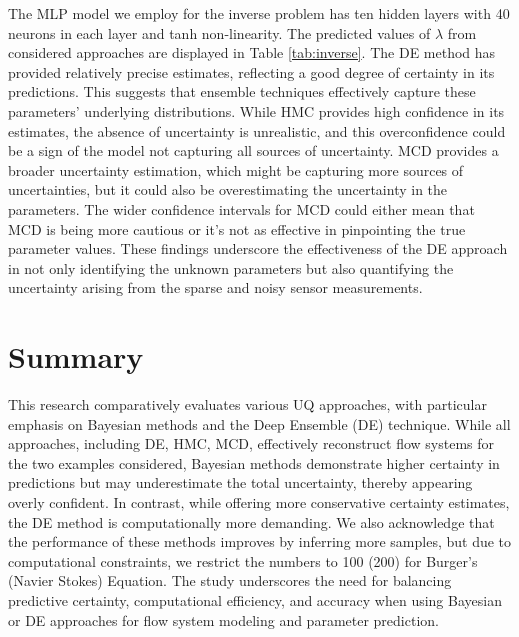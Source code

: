 \documentclass{article}
\begin{document}
The MLP model we employ for the inverse problem has ten hidden layers with 40 neurons in each layer and tanh non-linearity.
The predicted values of $\lambda$ from considered approaches are displayed in Table \ref{tab:inverse}.
The DE method has provided relatively precise estimates, reflecting a good degree of certainty in its predictions. This suggests that ensemble techniques effectively capture these parameters’ underlying distributions. While HMC provides high confidence in its estimates, the absence of uncertainty is unrealistic, and this overconfidence could be a sign of the model not capturing all sources of uncertainty. MCD provides a broader uncertainty estimation, which might be capturing more sources of uncertainties, but it could also be overestimating the uncertainty in the parameters. The wider confidence intervals for MCD could either mean that MCD is being more cautious or it’s not as effective in pinpointing the true parameter values.
These findings underscore the effectiveness of the DE approach in not only identifying the unknown parameters but also quantifying the uncertainty arising from the sparse and noisy sensor measurements.


\section{Summary}
This research comparatively evaluates various UQ approaches, with particular emphasis on Bayesian methods and the Deep Ensemble (DE) technique. While all approaches, including DE, HMC, MCD, effectively reconstruct flow systems for the two examples considered, Bayesian methods demonstrate higher certainty in predictions but may underestimate the total uncertainty, thereby appearing overly confident. In contrast, while offering more conservative certainty estimates, the DE method is computationally more demanding. We also acknowledge that the performance of these methods improves by inferring more samples, but due to computational constraints, we restrict the numbers to 100 (200) for Burger's (Navier Stokes) Equation. The study underscores the need for balancing predictive certainty, computational efficiency, and accuracy when using Bayesian or DE approaches for flow system modeling and parameter prediction. 
\end{document}
